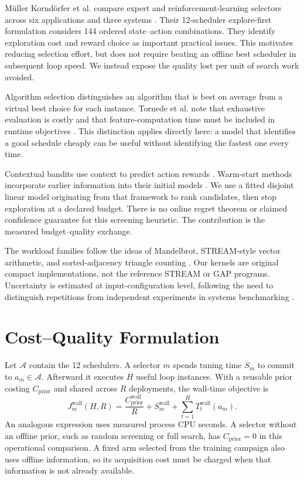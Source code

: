 \documentclass[conference]{IEEEtran}
\begin{document}
M\"uller Kornd\"orfer et al. compare expert and reinforcement-learning
selectors across six applications and three systems \cite{comparative}.
Their 12-scheduler explore-first formulation considers 144 ordered
state--action combinations. They identify exploration cost and reward choice
as important practical issues. This motivates reducing selection effort, but
does not require beating an offline best scheduler in subsequent loop speed.
We instead expose the quality lost per unit of search work avoided.

Algorithm selection distinguishes an algorithm that is best on average from
a virtual best choice for each instance. Tornede et al. note that exhaustive
evaluation is costly and that feature-computation time must be included in
runtime objectives \cite{meta}. This distinction applies directly here:
a model that identifies a good schedule cheaply can be useful without
identifying the fastest one every time.

Contextual bandits use context to predict action rewards \cite{linucb}.
Warm-start methods incorporate earlier information into their initial models
\cite{oetomo}. We use a fitted disjoint linear model originating from that
framework to rank candidates, then stop exploration at a declared budget.
There is no online regret theorem or claimed confidence guarantee for this
screening heuristic. The contribution is the measured budget--quality exchange.

The workload families follow the ideas of Mandelbrot, STREAM-style vector
arithmetic, and sorted-adjacency triangle counting \cite{stream,gap}.
Our kernels are original compact implementations, not the reference STREAM
or GAP programs. Uncertainty is estimated at input-configuration level,
following the need to distinguish repetitions from independent experiments
in systems benchmarking \cite{kalibera}.

\section{Cost--Quality Formulation}

Let $\mathcal A$ contain the 12 schedulers. A selector $m$ spends tuning time
$S_m$ to commit to $a_m\in\mathcal A$. Afterward it executes $H$ useful loop
instances. With a reusable prior costing $C_{\mathrm{prior}}$ and shared
across $R$ deployments, the wall-time objective is
\begin{equation}
 J_m^{\mathrm{wall}}(H,R)=
 \frac{C_{\mathrm{prior}}^{\mathrm{wall}}}{R}
 +S_m^{\mathrm{wall}}+\sum_{t=1}^{H}T_t^{\mathrm{wall}}(a_m).
 \label{eq:objective}
\end{equation}
An analogous expression uses measured process CPU seconds. A selector without
an offline prior, such as random screening or full search, has
$C_{\mathrm{prior}}=0$ in this operational comparison. A fixed arm selected
from the training campaign also uses offline information, so its acquisition
cost must be charged when that information is not already available.
\end{document}

